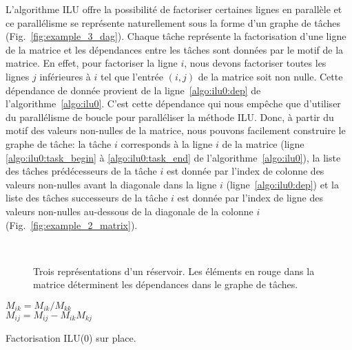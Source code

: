 L'algorithme ILU offre la possibilité de factoriser certaines lignes en parallèle et ce parallélisme se représente naturellement sous la forme d'un graphe de tâches (Fig.~\ref{fig:example_3_dag}).
%
Chaque tâche représente la factorisation d'une ligne de la matrice et les dépendances entre les tâches sont données par le motif de la matrice.
%
En effet, pour factoriser la ligne $i$, nous devons factoriser toutes les lignes $j$ inférieures à $i$ tel que l'entrée $(i,j)$ de la matrice soit non nulle.
%
Cette dépendance de donnée provient de la ligne~\ref{algo:ilu0:dep} de l'algorithme~\ref{algo:ilu0}.
%
C'est cette dépendance qui nous empêche que d'utiliser du parallélisme de boucle pour paralléliser la méthode ILU.
%
Donc, à partir du motif des valeurs non-nulles de la matrice, nous pouvons facilement construire le graphe de tâche:
%
la tâche $i$ corresponds à la ligne $i$ de la matrice (ligne \ref{algo:ilu0:task_begin} à \ref{algo:ilu0:task_end} de l'algorithme~\ref{algo:ilu0}), la liste des tâches prédécesseurs de la tâche $i$ est donnée par l'index de colonne des valeurs non-nulles avant la diagonale dans la ligne $i$ (ligne~\ref{algo:ilu0:dep}) et la liste des tâches successeurs de la tâche $i$ est donnée par l'index de ligne des valeurs non-nulles au-dessous de la diagonale de la colonne $i$ (Fig.~\ref{fig:example_2_matrix}).

\begin{figure}[!h]
     \begin{center}
        ~
        ~
    \end{center}
    \caption{Trois représentations d'un réservoir. Les éléments en rouge dans la matrice déterminent les dépendances dans le graphe de tâches.}
    \label{fig:exemple_3_dag}
\end{figure}

\begin{algorithm}
   {
     { \label{algo:ilu0:task_begin}
      $M_{ik} = M_{ik} / M_{kk}$ \label{algo:ilu0:dep}\\
       {
        $M_{ij} = M_{ij} - M_{ik}M_{kj}$ \\
      }
    } \label{algo:ilu0:task_end}
  }
  \caption{Factorisation ILU(0) sur place.}
  \label{algo:ilu0}
\end{algorithm}


